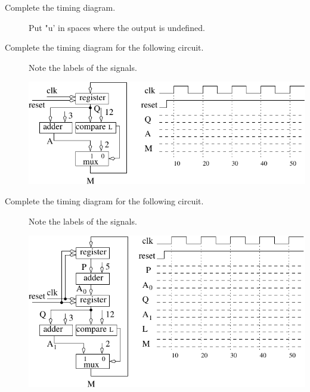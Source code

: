 \begin{description}
\item[Complete the timing diagram.]  Put "u' in spaces where the output
is undefined.


\pagebreak
\item[Complete the timing diagram for the following circuit.]
Note the labels of the signals.

\includegraphics{./FigWork/BBBtiming1}



\item[Complete the timing diagram for the following circuit.]
Note the labels of the signals.

\includegraphics{./FigWork/BBBtiming2}

\end{description}
